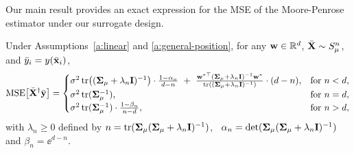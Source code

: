 \documentclass[11pt]{article}
\begin{document}
Our main result provides an exact expression for the MSE of the
Moore-Penrose estimator under our surrogate design.


\begin{theorem}
  \label{t:mse}
  Under Assumptions~\ref{a:linear} and \ref{a:general-position},
  for any $\mathbf w \in \mathbb{R}^d$, ${\bar{\mathbf X}}\sim S_\mu^n$,
  and
  ${\bar y}_i=y(\bar{\mathbf x}_i)$, %
  \vspace{-2mm}
  \begin{align*}
    \MSE{\Xb^\dagger\ybb} =
    \begin{cases}
      \sigma^2\,\tr\big((\Sigmab_\mu+\lambda_n\I)^{-1}\big)\cdot
      \frac{1-\alpha_n}{d-n}\ +\
      \frac{\w^{*\top}(\Sigmab_\mu+\lambda_n\I)^{-1}\w^*}
      {\tr((\Sigmab_\mu+\lambda_n\I)^{-1})}\cdot (d-n),
                                                                 & \text{for }n<d, \\
      \sigma^2\, \tr(\Sigmab_\mu^{-1}),                          & \text{for }n=d, \\
      \sigma^2\,\tr(\Sigmab_\mu^{-1})\cdot\frac{1-\beta_n}{n-d}, & \text{for
      }n>d,
    \end{cases}
  \end{align*}
  with $\lambda_n\geq 0$ defined by
  $n=\mathrm{tr}(\mathbf{\Sigma}_\mu (\mathbf{\Sigma}_\mu+\lambda_n\mathbf I)^{-1})$, \
  $\alpha_n=\det(\mathbf{\Sigma}_\mu(\mathbf{\Sigma}_\mu+\lambda_n\mathbf I)^{-1})$
  and $\beta_n=\ee^{d-n}$.
\end{theorem}
\end{document}
